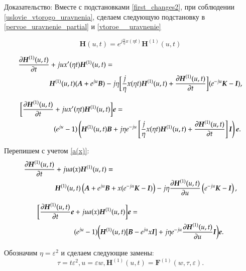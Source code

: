 

Доказательство:
Вместе с подстановками \eqref{first_changes2}, при соблюдении \eqref{uslovie_vtorogo_uravnenia}, сделаем следующую подстановку в \eqref{pervoe_uravnenie_partial} и \eqref{vtoroe__uravnenie}

\[\boldsymbol{H}(u,t) = e^{j\frac{u}{\eta}x(\eta t)}\boldsymbol{H}^{(1)}(u,t)\]

\begin{align*}
    \pdv{\boldsymbol{H}^{(1)}(u,t)}{t} &+ jux'(\eta t)\boldsymbol{H}^{(1)}(u,t) = \\
    &\boldsymbol{H}^{(1)}(u,t)(\boldsymbol{A}+e^{ju}\boldsymbol{B})
    -j\eta \bigg[ \frac{j}{\eta} x(\eta t)\boldsymbol{H}^{(1)}(u,t)
    + \pdv{\boldsymbol{H}^{(1)}(u,t)}{t}\bigg](e^{-ju}\boldsymbol{K}-\boldsymbol{I}), 
\end{align*}

\begin{align*}
	\bigg[\pdv{\boldsymbol{H}^{(1)}(u,t)}{t} 
        &+ jux'(\eta t)\boldsymbol{H}^{(1)}(u,t) \bigg]  \boldsymbol{e}=\\
	&(e^{ju}-1)
    \left( {\boldsymbol{H}^{(1)}(u,t)\boldsymbol{B}
        +j\eta e^{-ju} \left[ {
            \frac{j}{\eta} x(\eta t)\boldsymbol{H}^{(1)}(u,t)
            + \pdv{\boldsymbol{H}^{(1)}(u,t)}{t}} \right]
        \boldsymbol{I}} \right)
    \boldsymbol{e}.
\end{align*}

Перепишем с учетом \eqref{a(x)}:	
\begin{align*}
\pdv{\boldsymbol{H}^{(1)}(u,t)}{t} &+ jua(x)\boldsymbol{H}^{(1)}(u,t) = \\
	&\boldsymbol{H}^{(1)}(u,t)
    \left( {\boldsymbol{A}+e^{ju}\boldsymbol{B}+x(e^{-j u}\boldsymbol{K}- \boldsymbol{I})} \right)
    -j\eta \pdv{\boldsymbol{H}^{(1)}(u,t)}{u}
        \left( {e^{-j u}\boldsymbol{K}- \boldsymbol{I}} \right),
\end{align*}

\begin{align*}
	\bigg[\pdv{\boldsymbol{H}^{(1)}(u,t)}{t}\boldsymbol{e} &+ jua(x)\boldsymbol{H}^{(1)}(u,t) \bigg]  
    \boldsymbol{e}=\\
	&(e^{ju}-1)\bigg(\boldsymbol{H}^{(1)}(u,t)[\boldsymbol{B}-e^{j u}x\boldsymbol{I}]
	+j\eta e^{-ju} \pdv{\boldsymbol{H}^{(1)}(u,t)}{u}\boldsymbol{I}\bigg)\boldsymbol{e}.
\end{align*}

Обозначим \(\eta = \varepsilon^2\) и сделаем следующие замены:
\[ \tau = t \varepsilon^2 , u = \varepsilon w, \boldsymbol{H}^{(1)}(u,t) = \boldsymbol{F}^{(1)}(w, \tau , \varepsilon).\]

